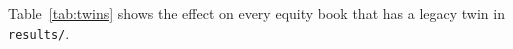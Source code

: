 Table~\ref{tab:twins} shows the effect on every equity book that has a legacy twin in \texttt{results/}.
